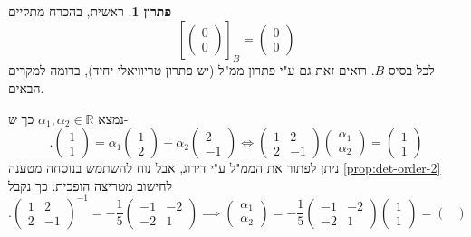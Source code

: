 \documentclass[12pt]{report}
\theoremstyle{plain}
\theoremstyle{definition}
\newtheorem*{solution}{פתרון}
\newcommand{\R}{\mathbb{R}}
\newcommand{\0}{\mathbf{0}}
\begin{document}
\begin{solution}
ראשית, בהכרח מתקיים
$$
\left[\begin{pmatrix}
0 \\
0
\end{pmatrix}\right]_B=\begin{pmatrix}
0 \\
0
\end{pmatrix}
$$
לכל בסיס
$B$.
רואים זאת גם ע"י פתרון ממ"ל (יש פתרון טריוויאלי יחיד), בדומה למקרים הבאים.

נמצא
$\alpha_1,\alpha_2\in\R$
כך ש-
$$
.\begin{pmatrix}
1 \\
1
\end{pmatrix}=\alpha_1\begin{pmatrix}
1 \\
2
\end{pmatrix}+\alpha_2\begin{pmatrix}
2 \\
-1
\end{pmatrix} \iff \begin{pmatrix}
1 & 2 \\
2 & -1
\end{pmatrix}\begin{pmatrix}
\alpha_1 \\
\alpha_2
\end{pmatrix}=\begin{pmatrix}
1 \\
1
\end{pmatrix}
$$
ניתן לפתור את הממ"ל ע"י דירוג, אבל נוח להשתמש בנוסחה מטענה 
\ref{prop:det-order-2}
לחישוב מטריצה הופכית. כך נקבל
$$
.\begin{pmatrix}
1 & 2 \\
2 & -1
\end{pmatrix}^{-1}=-\frac{1}{5}\begin{pmatrix}
-1 & -2 \\
-2 & 1
\end{pmatrix} \implies \begin{pmatrix}
\alpha_1 \\
\alpha_2
\end{pmatrix}=-\frac{1}{5}\begin{pmatrix}
-1 & -2 \\
-2 & 1
\end{pmatrix}\begin{pmatrix}
1 \\
1
\end{pmatrix}=\begin{pmatrix}

\end{pmatrix}$$
\end{solution}
\end{document}
